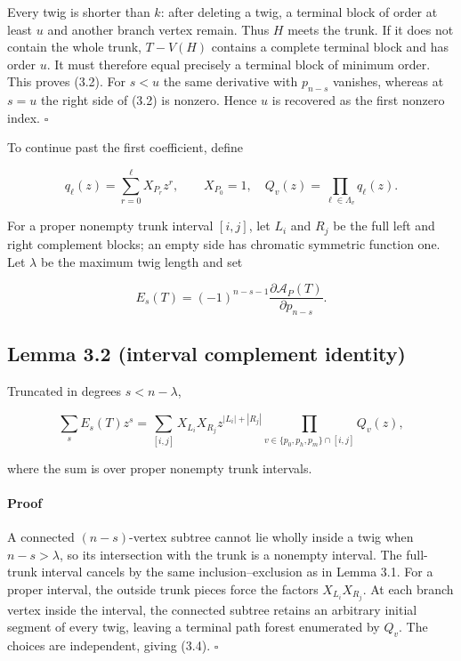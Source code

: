 \documentclass[11pt]{article}
\begin{document}
Every twig is shorter than $k$: after deleting a twig, a terminal block of order at least $u$ and
another branch vertex remain. Thus $H$ meets the trunk. If it does not contain the whole trunk,
$T-V(H)$ contains a complete terminal block and has order $u$. It must therefore equal precisely a
terminal block of minimum order. This proves (3.2). For $s<u$ the same derivative with
$p_{n-s}$ vanishes, whereas at $s=u$ the right side of (3.2) is nonzero. Hence $u$ is recovered as
the first nonzero index. $\square$

To continue past the first coefficient, define

\begin{equation*}
q_\ell(z)=\sum_{r=0}^{\ell}X_{P_r}z^r,\qquad X_{P_0}=1,
\quad
Q_v(z)=\prod_{\ell\in\Lambda_v}q_\ell(z).
\tag{3.3}
\end{equation*}


For a proper nonempty trunk interval $[i,j]$, let $L_i$ and $R_j$ be the full left and right
complement blocks; an empty side has chromatic symmetric function one. Let $\lambda$ be the maximum
twig length and set

\begin{equation*}
E_s(T)=(-1)^{n-s-1}\frac{\partial\mathcal A_P(T)}{\partial p_{n-s}}.
\end{equation*}


\Needspace{0.13\textheight}
\subsection*{Lemma 3.2 (interval complement identity)}


Truncated in degrees $s<n-\lambda$,

\begin{equation*}
\sum_sE_s(T)z^s=
\sum_{[i,j]}
X_{L_i}X_{R_j}z^{|L_i|+|R_j|}
\prod_{v\in\{p_0,p_h,p_m\}\cap[i,j]}Q_v(z),
\tag{3.4}
\end{equation*}


where the sum is over proper nonempty trunk intervals.

\paragraph{Proof}


A connected $(n-s)$-vertex subtree cannot lie wholly inside a twig when $n-s>\lambda$, so its
intersection with the trunk is a nonempty interval. The full-trunk interval cancels by the same
inclusion--exclusion as in Lemma 3.1. For a proper interval, the outside trunk pieces force the
factors $X_{L_i}X_{R_j}$. At each branch vertex inside the interval, the connected subtree retains
an arbitrary initial segment of every twig, leaving a terminal path forest enumerated by $Q_v$.
The choices are independent, giving (3.4). $\square$
\end{document}
